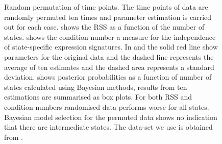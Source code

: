 \begin{figure}
  \centering
  \caption{Random permutation of time points. The time points of data are randomly permuted ten times and parameter estimation is carried out for each case.  shows the RSS as a function of the number of states.  shows the condition number a measure for the independence of state-specific expression signatures. In  and  the solid red line show parameters for the original data and the dashed line represents the average of ten estimates and the dashed area represents a standard deviation.  shows posterior probabilities as a function of number of states calculated using Bayesian methods, results from ten estimations are summarised as box plots. For both RSS and condition numbers randomised data performs worse for all states. Bayesian model selection for the permuted data shows no indication that there are intermediate states. The data-set we use is obtained from \citep{SamavarchiTehrani:2010cp}.}
\label{fig:permutation-repro}
\end{figure}

